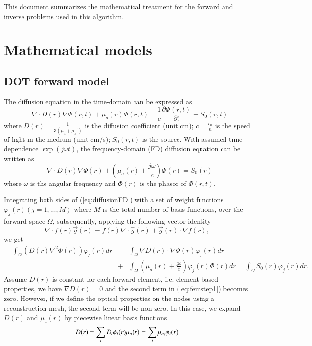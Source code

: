 \documentclass[12pt]{book}               %
\begin{document}
This document summarizes the mathematical treatment for the forward 
and inverse problems used in this algorithm.

\chapter{Mathematical models}

\section{DOT forward model}

The diffusion equation in the time-domain can be expressed as~\cite{Arridge1999}
\begin{equation}
\label{eq:diffusionTD} -\nabla\cdot
D(r)\nabla\Phi(r,t)+\mu_a(r)\Phi(r,t)+\frac{1}{c}\frac{\partial
\Phi(r,t)}{\partial t}=S_0(r,t)
\end{equation}
where $D(r)=\frac{1}{3(\mu_a+\mu_s')}$ is the diffusion
coefficient (unit cm); $c=\frac{c_0}{n}$ is the speed of light in the
medium (unit cm/s); $S_0(r,t)$ is the source. With assumed time dependence
$\exp(j\omega t)$, the frequency-domain (FD) diffusion equation can be
written as
\begin{equation}
\label{eq:diffusionFD} -\nabla\cdot
D(r)\nabla\Phi(r)+\left(\mu_a(r)+\frac{j\omega}{c}\right)\Phi(r)=S_0(r)
\end{equation}
where $\omega$ is the angular frequency and $\Phi(r)$ is the
phasor of $\Phi(r,t)$.

Integrating both sides of (\ref{eq:diffusionFD}) with a set of weight functions $\varphi_j(r) (j=1,...,M)$
where $M$ is the total number of basis functions, over the forward space $\Omega$, subsequently, applying the following vector
identity
\begin{equation}
\label{eq:veciden}\nabla\cdot f(r)\vec{g}(r)=f(r)\nabla\cdot
\vec{g}(r)+\vec{g}(r)\cdot\nabla f(r),
\end{equation}
we get
\begin{eqnarray}
\label{eq:femstep1}
-\int_{\Omega}{(D(r)\nabla^2\Phi(r))\varphi_j(r)dr}&-&\int_{\Omega}{\nabla D(r)\cdot\nabla\Phi(r)
\varphi_j(r)dr}\\\nonumber &+&\int_{\Omega}
{\left(\mu_a(r)+\frac{j\omega}{c}\right)\varphi_j(r)\Phi(r)dr}=\int_{\Omega}
{S_0(r)\varphi_j(r)dr}.
\end{eqnarray}
Assume $D(r)$ is constant for each forward element, i.e. element-based properties, 
we have $\nabla D(r)=0$ and the second term in (\ref{eq:femstep1}) becomes zero. 
However, if we define the optical properties on the nodes using a reconstruction mesh,
the second term will be non-zero. In this case, we expand $D(r)$ and $\mu_{a}(r)$ by
piecewise linear basis functions
\begin{equation}
\label{eq:parammesh}D(r)=\sum_{i}D_i\phi_i(r) \\
\mu_{a}(r)=\sum_{i}\mu_{a_i}\phi_i(r)
\end{equation}
\end{document}
